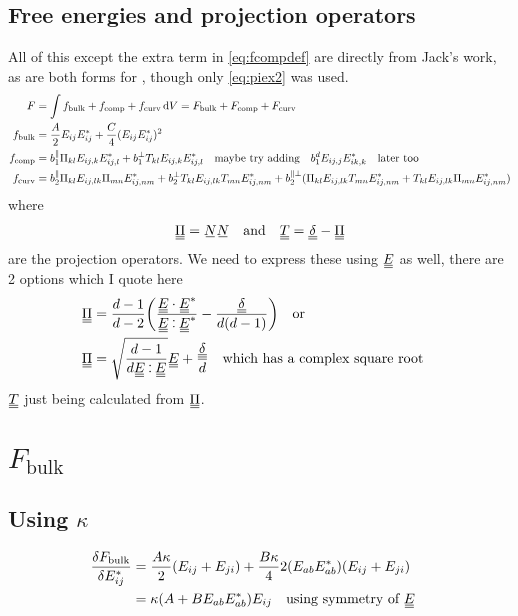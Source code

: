 \documentclass[11pt]{article}
\begin{document}
\subsection{Free energies and projection operators}\label{sec:freeenergies}
All of this except the extra term in \cref{eq:fcompdef} are directly from Jack's work, as are both forms for \PP, though only \cref{eq:piex2} was used.
\begin{align}
    F &= \int f_\text{bulk} + f_\text{comp} + f_\text{curv} \dd{V} = F_\text{bulk} + F_\text{comp} + F_\text{curv}\\
    f_\text{bulk} &= \frac{A}{2} E_{ij}E_{ij}^* + \frac{C}{4} (E_{ij}E_{ij}^*)^2 \\
    f_\text{comp} &= b_1^\parallel \Pi_{kl} E_{ij,k}E_{ij,l}^* + b_1^\perp T_{kl} E_{ij,k}E_{ij,l}^* \qq{maybe try adding} b_1^d E_{ij,j}E_{ik,k}^* \qq{later too} \label{eq:fcompdef} \\
    f_\text{curv} &= b_2^\parallel \Pi_{kl}E_{ij,lk}\Pi_{mn}E_{ij,nm}^* + b_2^\perp T_{kl}E_{ij,lk}T_{mn}E_{ij,nm}^* + b_2^{\parallel\perp}(\Pi_{kl}E_{ij,lk}T_{mn}E_{ij,nm}^* + T_{kl}E_{ij,lk}\Pi_{mn}E_{ij,nm}^*)
\end{align}
where
\begin{align}
    \du{\Pi} = \su{N} \su{N} && \text{and} && \du{T} = \du{\delta} - \du{\Pi}
\end{align}
are the projection operators. We need to express these using $\du{E}$ as well, there are 2 options which I quote here
\begin{align}
    \du{\Pi} & = \frac{d-1}{d-2}\qty(\frac{\du{E} \cdot \du{E}^*}{\du{E} \cddot \du{E}^*} - \frac{\du{\delta}}{d(d-1)}) \qq{or} \label{eq:piex1}\\
    \du{\Pi} & = \sqrt{\frac{d-1}{d \du{E} \cddot \du{E}}} \du{E} + \frac{\du{\delta}}{d} \label{eq:piex2} \qq{which has a complex square root}
\end{align}
$\du{T}$ just being calculated from $\du{\Pi}$.

\pagebreak
\section{$F_\text{bulk}$}
\subsection{Using $\kappa$}
\begin{align}
    \fdv{F_\text{bulk}}{E_{ij}^*} &= \frac{A\kappa}{2}(E_{ij} + E_{ji}) + \frac{B\kappa}{4} 2(E_{ab}E_{ab}^*)(E_{ij}+E_{ji}) \\
    &= \kappa(A + B E_{ab}E_{ab}^*) E_{ij} \qq{using symmetry of \EE}
\end{align}
\end{document}

